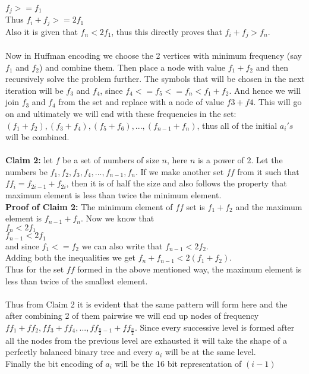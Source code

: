 \documentclass{article}
\begin{document}
$f_j >= f_1$\\
Thus $f_i+f_j >= 2f_1$\\ 
Also it is given that $f_n < 2f_1$, thus this directly proves that $f_i+ f_j > f_n$.
\\\\
Now in Huffman encoding we choose the 2 vertices with minimum frequency (say $f_1$ and $f_2$) and combine them. Then place a node with value $f_1+f_2$ and then recursively solve the problem further. The symbols that will be chosen in the next iteration will be $f_3$ and $f_4$, since $f_4<= f_5<= f_n < f_1+ f_2$. And hence we will join $f_3$ and $f_4$ from the set and replace with a node of value $f3+f4$. This will go on and ultimately we will end with these frequencies in the set: $(f_1+f_2), (f_3+f_4), (f_5+f_6), ... ,(f_{n-1}+f_n)$, thus all of the initial $a_i's$ will be combined.
\\\\
\textbf{Claim 2:} let $f$ be a set of numbers of size $n$, here $n$ is a power of 2. Let the numbers be $f_1, f_2, f_3, f_4, ... ,f_{n-1}, f_n$. If we make another set $ff$ from it such that ${ff}_i = f_{2i-1} + f_{2i}$, then it is of half the size and also follows the property that maximum element is less than twice the minimum element. 
\\
\textbf{Proof of Claim 2:} The minimum element of $ff$ set is $f_1+f_2$ and the maximum element is $f_{n-1}+f_n$. Now we know that\\ 
$f_n < 2f_1$\\
$f_{n-1} < 2f_1$\\
and since $f_1 <= f_2$ we can also write that $f_{n-1} < 2f_2$.\\
Adding both the inequalities we get $f_n + f_{n-1} < 2(f_1+ f_2)$.\\
Thus for the set $ff$ formed in the above mentioned way, the maximum element is less than twice of the smallest element. 
\\\\
Thus from Claim 2 it is evident that the same pattern will form here and the after combining 2 of them pairwise we will end up nodes of frequency $ff_1+ff_2, ff_3+ff_4, ... , ff_{\frac{n}{2}-1}+ff_{\frac{n}{2}}$. Since every successive level is formed after all the nodes from the previous level are exhausted it will take the shape of a perfectly balanced binary tree and every $a_i$ will be at the same level.\\Finally the bit encoding of $a_i$ will be the 16 bit representation of $(i-1)$
\end{document}
